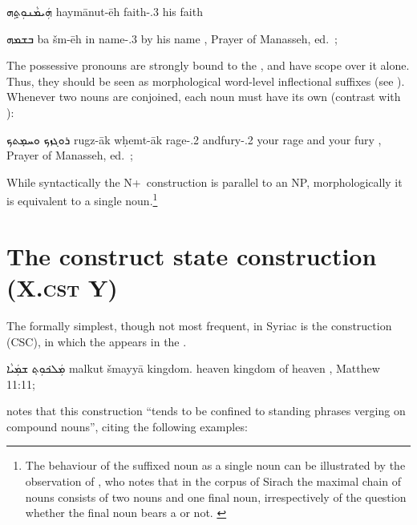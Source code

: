 {ܗܲܝܡܵܢܘܼܬ݂ܹܗ}
{haymānut-ēh}
{faith-\poss.3\masc}
{his faith}
{\cite[70, \S 91e]{MuraokaSyriac}}

{ܒܫܡܗ}
{ba\cb{} šm-ēh}
{in\cb{} name-\poss.3\masc}
{by his name}
{\Pesh, Prayer of Manasseh, ed.\ \cite[A3]{BaarsSchneider}; \cite[90 (3A)]{GutmanVanPeursen}}

\newpage 
The possessive pronouns are strongly bound to the , and have scope over it alone. Thus, they should be seen as morphological word-level inflectional suffixes (see ). Whenever two nouns are conjoined, each noun must have its own  (contrast with ):

{ܪܘ\hspace{-0.7ex}ܓܙ\hspace{-0.4ex}ܟ ܘܚܡ̣ܬ\hspace{-0.3ex}ܟ}
{rugz-āk w\cb{}ḥemt-āk}
{rage-\poss.2\masc{} and\cb{}fury-\poss.2\masc}
{your rage and your fury}
{\Pesh, Prayer of Manasseh, ed.\ \cite[A3]{BaarsSchneider}; \cite[90 (4A)]{GutmanVanPeursen}}

 While syntactically the N+\poss\ construction is parallel to an NP, morphologically it is equivalent to a single noun.\footnote{The behaviour of the suffixed noun as a single noun can be illustrated by the observation of \citet[187, fn. 21]{PeursenBenSira}, who notes that in the corpus of Sirach the maximal chain of \cst* nouns consists of two \cst* nouns and one final noun, irrespectively of the question whether the final noun bears a  or not. \label{ft:SirachSuffix} } 


\section{The construct state construction (X.\textsc{cst} Y)} \label{ss:syr_cst}

The formally simplest, though not most frequent,  in Syriac is the \cst* construction (CSC), in which the \prim appears in the \cst*. 

{ܡܲܠܟ݁ܘܼܬ݂ ܫܡܲܝܵܐ}
{malkut šmayyā}
{kingdom.\cst{} heaven}
{kingdom of heaven}
{\Pesh, Matthew 11:11; \cite[61, \S 73a]{MuraokaSyriac}}


\citet[61]{MuraokaSyriac} notes that this construction \enquote{tends to be confined to standing phrases verging on compound nouns}, citing the following examples:

